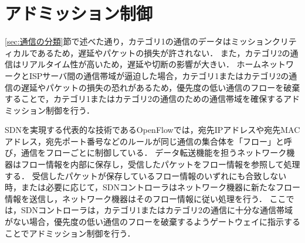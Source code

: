 \documentclass[a4paper,11pt,uplatex]{ujreport}
\begin{document}
\section{アドミッション制御}
\label{sec:アドミッション制御}

  \ref{sec:通信の分類}節で述べた通り，カテゴリ1の通信のデータはミッションクリティカルであるため，遅延やパケットの損失が許されない．
  また，カテゴリ2の通信はリアルタイム性が高いため，遅延や切断の影響が大きい．
  ホームネットワークとISPサーバ間の通信帯域が逼迫した場合，カテゴリ1またはカテゴリ2の通信の遅延やパケットの損失の恐れがあるため，優先度の低い通信のフローを破棄することで，カテゴリ1またはカテゴリ2の通信のための通信帯域を確保するアドミッション制御を行う．\par

  SDNを実現する代表的な技術であるOpenFlowでは，宛先IPアドレスや宛先MACアドレス，宛先ポート番号などのルールが同じ通信の集合体を「フロー」と呼び，通信をフローごとに制御している．
  データ転送機能を担うネットワーク機器はフロー情報を内部に保存し，受信したパケットをフロー情報を参照して処理する．
  受信したパケットが保存しているフロー情報のいずれにも合致しない時，または必要に応じて，SDNコントローラはネットワーク機器に新たなフロー情報を送信し，ネットワーク機器はそのフロー情報に従い処理を行う．
  ここでは，SDNコントローラは，カテゴリ1またはカテゴリ2の通信に十分な通信帯域がない場合，優先度の低い通信のフローを破棄するようゲートウェイに指示することでアドミッション制御を行う．\par
\end{document}
